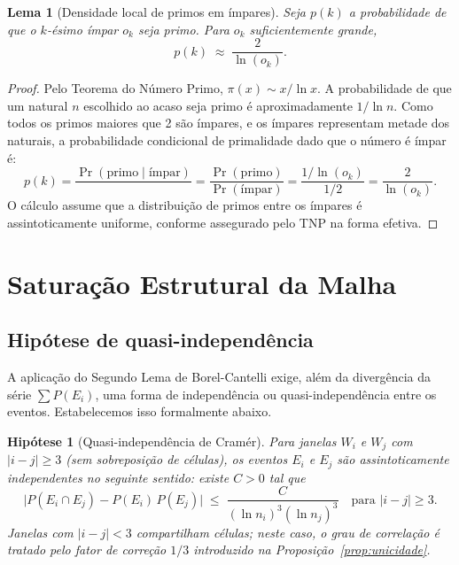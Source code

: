 \documentclass{article}
\newtheorem{lemma}[proposition]{Lema}
\newtheorem{assumption}[proposition]{Hipótese}
\begin{document}
	\begin{lemma}[Densidade local de primos em ímpares]
		\label{lem:densidade}
		Seja $p(k)$ a probabilidade de que o $k$-ésimo ímpar $o_k$
		seja primo. Para $o_k$ suficientemente grande,
		\[
		p(k) \;\approx\; \frac{2}{\ln(o_k)}.
		\]
	\end{lemma}
	
	\begin{proof}
		Pelo Teorema do Número Primo, $\pi(x) \sim x/\ln x$.
		A probabilidade de que um natural $n$ escolhido ao acaso seja
		primo é aproximadamente $1/\ln n$. Como todos os primos maiores
		que 2 são ímpares, e os ímpares representam metade dos naturais,
		a probabilidade condicional de primalidade dado que o número é
		ímpar é:
		\[
		p(k) = \frac{\Pr(\text{primo} \mid \text{ímpar})}{}
		= \frac{\Pr(\text{primo})}{\Pr(\text{ímpar})}
		= \frac{1/\ln(o_k)}{1/2}
		= \frac{2}{\ln(o_k)}.
		\]
		O cálculo assume que a distribuição de primos entre os ímpares
		é assintoticamente uniforme, conforme assegurado pelo
		TNP na forma efetiva.
	\end{proof}
	
	\section{Saturação Estrutural da Malha}
	\label{sec:saturacao}
	
	\subsection{Hipótese de quasi-independência}
	
	A aplicação do Segundo Lema de Borel-Cantelli exige, além da
	divergência da série $\sum P(E_i)$, uma forma de independência
	ou quasi-independência entre os eventos. Estabelecemos isso
	formalmente abaixo.
	
	\begin{assumption}[Quasi-independência de Cramér]
		\label{hip:cramer}
		Para janelas $W_i$ e $W_j$ com $|i - j| \geq 3$ (sem sobreposição
		de células), os eventos $E_i$ e $E_j$ são assintoticamente
		independentes no seguinte sentido: existe $C > 0$ tal que
		\[
		\bigl|P(E_i \cap E_j) - P(E_i)\,P(E_j)\bigr|
		\;\leq\; \frac{C}{(\ln n_i)^3 (\ln n_j)^3}
		\quad \text{para } |i-j| \geq 3.
		\]
		Janelas com $|i-j| < 3$ compartilham células; neste caso, o
		grau de correlação é tratado pelo fator de correção $1/3$
		introduzido na Proposição~\ref{prop:unicidade}.
	\end{assumption}
	
\end{document}
